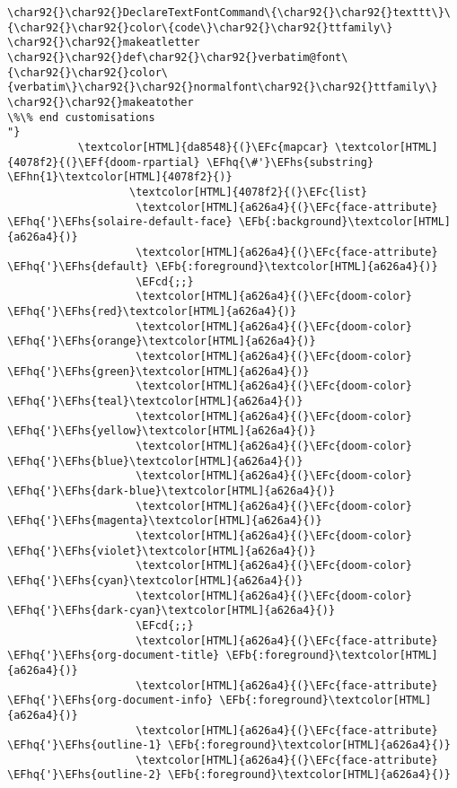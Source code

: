 \documentclass{scrartcl}
\newcommand{\EFb}[1]{\textcolor{EFb}{#1}} %
\newcommand{\EFc}[1]{\textcolor{EFc}{#1}} %
\newcommand{\EFf}[1]{\textcolor{EFf}{#1}} %
\newcommand{\EFcd}[1]{\textcolor{EFcd}{#1}} %
\newcommand{\EFhn}[1]{\textcolor{EFhn}{\textbf{#1}}} %
\newcommand{\EFhq}[1]{\textcolor{EFhq}{#1}} %
\newcommand{\EFhs}[1]{\textcolor{EFhs}{#1}} %
\begin{document}
\begin{enumerate}
\begin{Code}
\begin{Verbatim}[]
\char92{}\char92{}DeclareTextFontCommand\{\char92{}\char92{}texttt\}\{\char92{}\char92{}color\{code\}\char92{}\char92{}ttfamily\}
\char92{}\char92{}makeatletter
\char92{}\char92{}def\char92{}\char92{}verbatim@font\{\char92{}\char92{}color\{verbatim\}\char92{}\char92{}normalfont\char92{}\char92{}ttfamily\}
\char92{}\char92{}makeatother
\%\% end customisations
"}
           \textcolor[HTML]{da8548}{(}\EFc{mapcar} \textcolor[HTML]{4078f2}{(}\EFf{doom-rpartial} \EFhq{\#'}\EFhs{substring} \EFhn{1}\textcolor[HTML]{4078f2}{)}
                   \textcolor[HTML]{4078f2}{(}\EFc{list}
                    \textcolor[HTML]{a626a4}{(}\EFc{face-attribute} \EFhq{'}\EFhs{solaire-default-face} \EFb{:background}\textcolor[HTML]{a626a4}{)}
                    \textcolor[HTML]{a626a4}{(}\EFc{face-attribute} \EFhq{'}\EFhs{default} \EFb{:foreground}\textcolor[HTML]{a626a4}{)}
                    \EFcd{;;}
                    \textcolor[HTML]{a626a4}{(}\EFc{doom-color} \EFhq{'}\EFhs{red}\textcolor[HTML]{a626a4}{)}
                    \textcolor[HTML]{a626a4}{(}\EFc{doom-color} \EFhq{'}\EFhs{orange}\textcolor[HTML]{a626a4}{)}
                    \textcolor[HTML]{a626a4}{(}\EFc{doom-color} \EFhq{'}\EFhs{green}\textcolor[HTML]{a626a4}{)}
                    \textcolor[HTML]{a626a4}{(}\EFc{doom-color} \EFhq{'}\EFhs{teal}\textcolor[HTML]{a626a4}{)}
                    \textcolor[HTML]{a626a4}{(}\EFc{doom-color} \EFhq{'}\EFhs{yellow}\textcolor[HTML]{a626a4}{)}
                    \textcolor[HTML]{a626a4}{(}\EFc{doom-color} \EFhq{'}\EFhs{blue}\textcolor[HTML]{a626a4}{)}
                    \textcolor[HTML]{a626a4}{(}\EFc{doom-color} \EFhq{'}\EFhs{dark-blue}\textcolor[HTML]{a626a4}{)}
                    \textcolor[HTML]{a626a4}{(}\EFc{doom-color} \EFhq{'}\EFhs{magenta}\textcolor[HTML]{a626a4}{)}
                    \textcolor[HTML]{a626a4}{(}\EFc{doom-color} \EFhq{'}\EFhs{violet}\textcolor[HTML]{a626a4}{)}
                    \textcolor[HTML]{a626a4}{(}\EFc{doom-color} \EFhq{'}\EFhs{cyan}\textcolor[HTML]{a626a4}{)}
                    \textcolor[HTML]{a626a4}{(}\EFc{doom-color} \EFhq{'}\EFhs{dark-cyan}\textcolor[HTML]{a626a4}{)}
                    \EFcd{;;}
                    \textcolor[HTML]{a626a4}{(}\EFc{face-attribute} \EFhq{'}\EFhs{org-document-title} \EFb{:foreground}\textcolor[HTML]{a626a4}{)}
                    \textcolor[HTML]{a626a4}{(}\EFc{face-attribute} \EFhq{'}\EFhs{org-document-info} \EFb{:foreground}\textcolor[HTML]{a626a4}{)}
                    \textcolor[HTML]{a626a4}{(}\EFc{face-attribute} \EFhq{'}\EFhs{outline-1} \EFb{:foreground}\textcolor[HTML]{a626a4}{)}
                    \textcolor[HTML]{a626a4}{(}\EFc{face-attribute} \EFhq{'}\EFhs{outline-2} \EFb{:foreground}\textcolor[HTML]{a626a4}{)}

\end{Verbatim}
\end{Code}
\end{enumerate}
\end{document}
